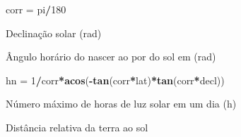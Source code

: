 \documentclass[
]{book}
\newenvironment{Shaded}{\begin{snugshade}}{\end{snugshade}}
\newcommand{\DecValTok}[1]{\textcolor[rgb]{0.00,0.00,0.81}{#1}}
\newcommand{\FloatTok}[1]{\textcolor[rgb]{0.00,0.00,0.81}{#1}}
\newcommand{\KeywordTok}[1]{\textcolor[rgb]{0.13,0.29,0.53}{\textbf{#1}}}
\newcommand{\NormalTok}[1]{#1}
\newcommand{\OperatorTok}[1]{\textcolor[rgb]{0.81,0.36,0.00}{\textbf{#1}}}
\newcommand{\StringTok}[1]{\textcolor[rgb]{0.31,0.60,0.02}{#1}}
\begin{document}
\begin{Shaded}
\begin{Highlighting}[]
\NormalTok{corr =}\StringTok{ }\NormalTok{pi}\OperatorTok{/}\DecValTok{180} 
\end{Highlighting}
\end{Shaded}

Declinação solar (rad)

\begin{Shaded}
\end{Shaded}

Ângulo horário do nascer ao por do sol em (rad)

\begin{Shaded}
\begin{Highlighting}[]
\NormalTok{hn =}\StringTok{ }\DecValTok{1}\OperatorTok{/}\NormalTok{corr}\OperatorTok{*}\KeywordTok{acos}\NormalTok{(}\OperatorTok{-}\KeywordTok{tan}\NormalTok{(corr}\OperatorTok{*}\NormalTok{lat)}\OperatorTok{*}\KeywordTok{tan}\NormalTok{(corr}\OperatorTok{*}\NormalTok{decl)) }
\end{Highlighting}
\end{Shaded}

Número máximo de horas de luz solar em um dia (h)

\begin{Shaded}
\end{Shaded}

Distância relativa da terra ao sol

\begin{Shaded}
\end{Shaded}
\end{document}
